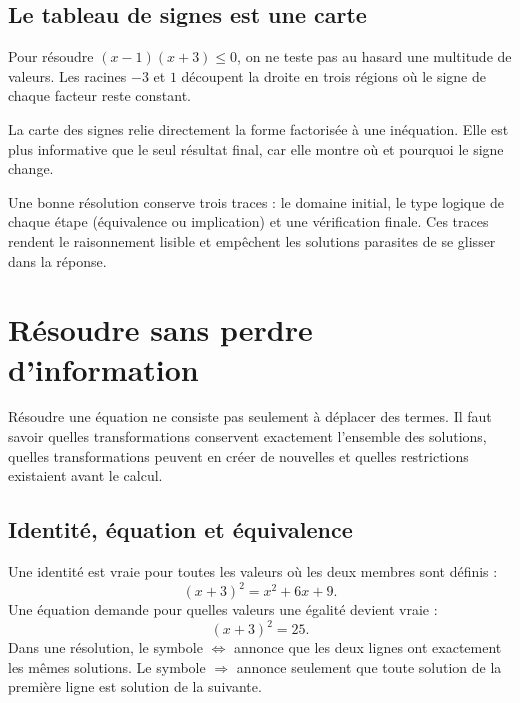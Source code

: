 \documentclass[12pt,a4paper,openany]{book}
\begin{document}
\subsection{Le tableau de signes est une carte}
Pour résoudre $(x-1)(x+3)\le0$, on ne teste pas au hasard une multitude de valeurs. Les racines $-3$ et $1$ découpent la droite en trois régions où le signe de chaque facteur reste constant.

\begin{center}
\end{center}

La carte des signes relie directement la forme factorisée à une inéquation. Elle est plus informative que le seul résultat final, car elle montre où et pourquoi le signe change.

\begin{connectionbox}
Une bonne résolution conserve trois traces : le domaine initial, le type logique de chaque étape (équivalence ou implication) et une vérification finale. Ces traces rendent le raisonnement lisible et empêchent les solutions parasites de se glisser dans la réponse.
\end{connectionbox}


\section{Résoudre sans perdre d'information}

Résoudre une équation ne consiste pas seulement à déplacer des termes. Il faut savoir quelles transformations conservent exactement l'ensemble des solutions, quelles transformations peuvent en créer de nouvelles et quelles restrictions existaient avant le calcul.

\subsection{Identité, équation et équivalence}

Une identité est vraie pour toutes les valeurs où les deux membres sont définis :
\[
(x+3)^2=x^2+6x+9.
\]
Une équation demande pour quelles valeurs une égalité devient vraie :
\[
(x+3)^2=25.
\]
Dans une résolution, le symbole $\Longleftrightarrow$ annonce que les deux lignes ont exactement les mêmes solutions. Le symbole $\Longrightarrow$ annonce seulement que toute solution de la première ligne est solution de la suivante.
\end{document}
